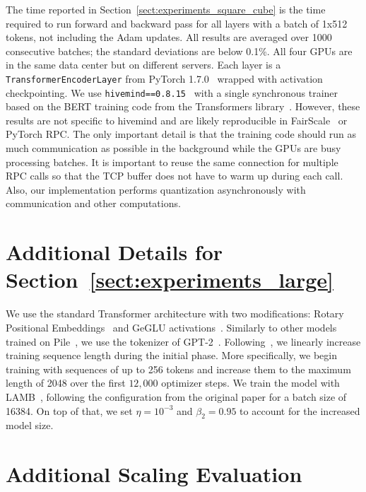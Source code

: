 The time reported in Section~\ref{sect:experiments_square_cube} is the time required to run forward and backward pass for all layers with a batch of 1x512 tokens, not including the Adam updates. All results are averaged over 1000 consecutive batches; the standard deviations are below 0.1\%. All four GPUs are in the same data center but on different servers. Each layer is a \texttt{TransformerEncoderLayer} from PyTorch 1.7.0~\citep{paszke2019pytorch} wrapped with activation checkpointing. We use \texttt{hivemind==0.8.15}~\citep{hivemind_dmoe} with a single synchronous trainer based on the BERT training code from the Transformers library~\citep{wolf-etal-2020-transformers}. However, these results are not specific to hivemind and are likely reproducible in FairScale~\citep{FairScale2021} or PyTorch RPC. The only important detail is that the training code should run as much communication as possible in the background while the GPUs are busy processing batches.
It is important to reuse the same connection for multiple RPC calls so that the TCP buffer does not have to warm up during each call. Also, our implementation performs quantization asynchronously with communication and other computations.

\section{Additional Details for Section~\ref{sect:experiments_large}}
\label{appendix:detailed_large}
\vspace{4pt}

We use the standard Transformer architecture with two modifications: Rotary Positional Embeddings~\citep{su2021roformer} and GeGLU activations~\citep{gated_improve}.
Similarly to other models trained on Pile~\citep{gao2020pile,gptj}, we use the tokenizer of GPT-2~\citep{radford2019language}. Following~\cite{curriculum_minja}, we linearly increase training sequence length during the initial phase. More specifically, we begin training with sequences of up to 256 tokens and increase them to the maximum length of 2048 over the first $12,000$ optimizer steps.
We train the model with LAMB~\citep{lamb}, following the configuration from the original paper for a batch size of 16384. On top of that, we set $\eta=10^{-3}$ and $\beta_2=0.95$ to account for the increased model size.

\section{Additional Scaling Evaluation}\label{appendix:scaling}

